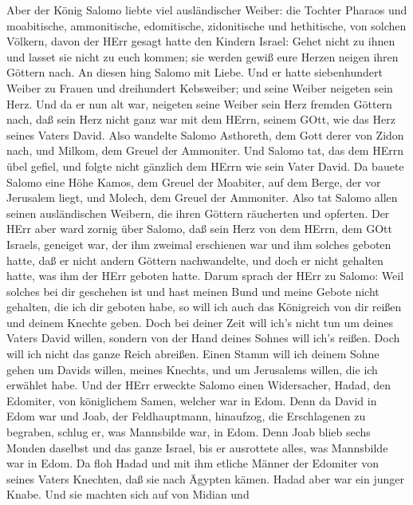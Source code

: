  Aber der König Salomo liebte viel ausländischer Weiber: die
Tochter Pharaos und moabitische, ammonitische, edomitische, zidonitische
und hethitische,  von solchen Völkern, davon der HErr gesagt
hatte den Kindern Israel: Gehet nicht zu ihnen und lasset sie nicht zu
euch kommen; sie werden gewiß eure Herzen neigen ihren Göttern nach. An
diesen hing Salomo mit Liebe.  Und er hatte siebenhundert
Weiber zu Frauen und dreihundert Kebsweiber; und seine Weiber neigeten
sein Herz.  Und da er nun alt war, neigeten seine Weiber
sein Herz fremden Göttern nach, daß sein Herz nicht ganz war mit dem
HErrn, seinem GOtt, wie das Herz seines Vaters David.  Also
wandelte Salomo Asthoreth, dem Gott derer von Zidon nach, und Milkom,
dem Greuel der Ammoniter.  Und Salomo tat, das dem HErrn
übel gefiel, und folgte nicht gänzlich dem HErrn wie sein Vater David.
 Da bauete Salomo eine Höhe Kamos, dem Greuel der Moabiter,
auf dem Berge, der vor Jerusalem liegt, und Molech, dem Greuel der
Ammoniter.  Also tat Salomo allen seinen ausländischen
Weibern, die ihren Göttern räucherten und opferten.  Der
HErr aber ward zornig über Salomo, daß sein Herz von dem HErrn, dem GOtt
Israels, geneiget war, der ihm zweimal erschienen war  und
ihm solches geboten hatte, daß er nicht andern Göttern nachwandelte, und
doch er nicht gehalten hatte, was ihm der HErr geboten hatte.
 Darum sprach der HErr zu Salomo: Weil solches bei dir
geschehen ist und hast meinen Bund und meine Gebote nicht gehalten, die
ich dir geboten habe, so will ich auch das Königreich von dir reißen und
deinem Knechte geben.  Doch bei deiner Zeit will ich's
nicht tun um deines Vaters David willen, sondern von der Hand deines
Sohnes will ich's reißen.  Doch will ich nicht das ganze
Reich abreißen. Einen Stamm will ich deinem Sohne gehen um Davids
willen, meines Knechts, und um Jerusalems willen, die ich erwählet habe.
 Und der HErr erweckte Salomo einen Widersacher, Hadad, den
Edomiter, von königlichem Samen, welcher war in Edom.  Denn
da David in Edom war und Joab, der Feldhauptmann, hinaufzog, die
Erschlagenen zu begraben, schlug er, was Mannsbilde war, in Edom.
 Denn Joab blieb sechs Monden daselbst und das ganze
Israel, bis er ausrottete alles, was Mannsbilde war in Edom.
 Da floh Hadad und mit ihm etliche Männer der Edomiter von
seines Vaters Knechten, daß sie nach Ägypten kämen. Hadad aber war ein
junger Knabe.  Und sie machten sich auf von Midian und
